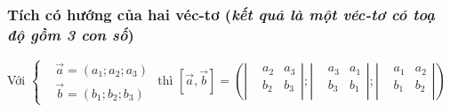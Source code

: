 \subsubsection{Tích có hướng của hai véc-tơ (\textit{kết quả là một véc-tơ có toạ độ gồm 3 con số})}
\centerline{Với $\left\{\begin{aligned}&\overrightarrow{a}=(a_1;a_2;a_3)\\&\overrightarrow{b}=(b_1;b_2;b_3)\end{aligned}\right.$ thì $\left[\overrightarrow{a},\overrightarrow{b}\right]=\left(\left|\begin{aligned}& a_2 & a_3 \\ & b_2 & b_3 \\ \end{aligned}\right|;\left|\begin{aligned}& a_3 & a_1 \\ & b_3 & b_1 \\ \end{aligned}\right|;\left|\begin{aligned}& a_1 & a_2 \\ & b_1 & b_2 \\ \end{aligned}\right|\right)$}
